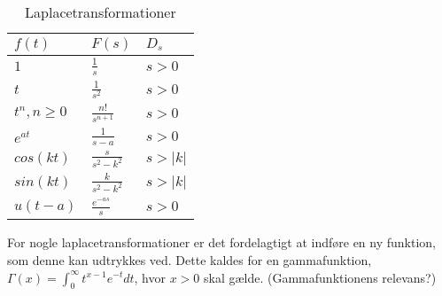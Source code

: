\begin{table}[htbp]
\centering
\caption{Laplacetransformationer}
\label{TableOne}
\begin{tabular}{|l|l|l|}
\hline
$f(t)$          & $F(s)$               & $D_s$     \\ \hline
$1$             & $\frac{1}{s}$        & $s > 0$   \\ \hline
$t$             & $\frac{1}{s^2}$      & $s > 0$   \\ \hline
$t^n, n \geq 0$ & $\frac{n!}{s^{n+1}}$ & $s > 0$   \\ \hline
$e^{at}$        & $\frac{1}{s-a}$      & $s > 0$   \\ \hline
$cos(kt)$       & $\frac{s}{s^2-k^2}$  & $s > |k|$ \\ \hline
$sin(kt)$       & $\frac{k}{s^2-k^2}$  & $s > |k|$ \\ \hline
$u(t-a)$        & $\frac{e^{-as}}{s}$  & $s > 0$   \\ \hline
\end{tabular}
\end{table}



For nogle laplacetransformationer er det fordelagtigt at indføre en ny funktion, som denne kan udtrykkes ved. Dette kaldes for en gammafunktion, $\Gamma \left( x \right) = \int_0^\infty {t^{x - 1} e^{ - t}} dt$, hvor $x >0$ skal gælde. (Gammafunktionens relevans?)
\hfill \break

